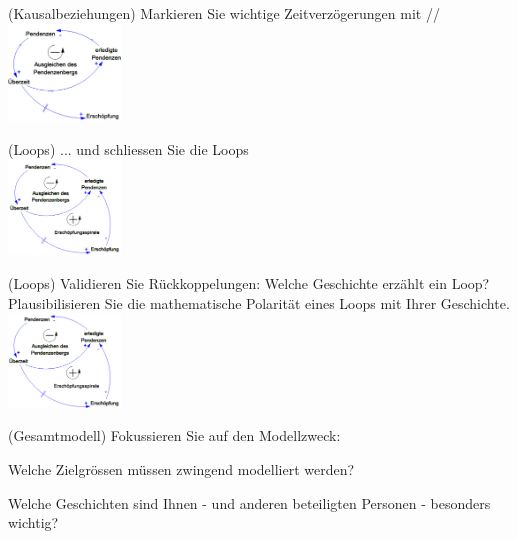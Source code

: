 \begin{multicols}{2}
\begin{compactenum}
		\item (Kausalbeziehungen) Markieren Sie wichtige Zeitverzögerungen mit // \\
		\includegraphics[width=0.225\textwidth]{pictures/regel_9}
		\item (Loops) ... und schliessen Sie die Loops \\
		\includegraphics[width=0.225\textwidth]{pictures/regel_10}
		\item (Loops) Validieren Sie Rückkoppelungen: Welche Geschichte erzählt ein	Loop? Plausibilisieren Sie die mathematische Polarität eines Loops mit Ihrer Geschichte. \\
		\includegraphics[width=0.225\textwidth]{pictures/regel_11}
		\item (Gesamtmodell) Fokussieren Sie auf den Modellzweck:
		\begin{compactitem}
			\item Welche Zielgrössen müssen zwingend modelliert werden?
			\item Welche Geschichten sind Ihnen - und anderen beteiligten Personen - besonders wichtig?
		\end{compactitem}
	\end{compactenum}
\end{multicols}	

